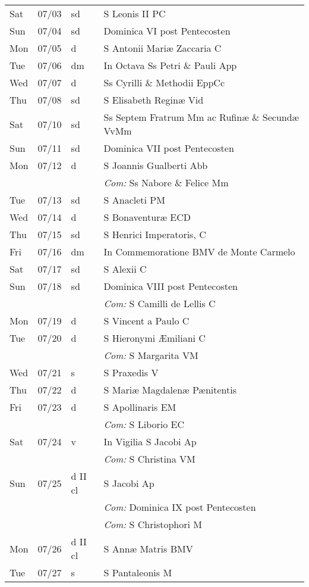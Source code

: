 \documentclass[10pt]{article}
\begin{document}
\begin{longtable}{ l l l l }
Sat & 07/03 & sd & S Leonis II PC\\
Sun & 07/04 & sd & Dominica VI post Pentecosten\\
Mon & 07/05 & d & S Antonii Mariæ Zaccaria C\\
Tue & 07/06 & dm & In Octava Ss Petri \& Pauli App\\
Wed & 07/07 & d & Ss Cyrilli \& Methodii EppCc\\
Thu & 07/08 & sd & S Elisabeth Reginæ Vid\\
Sat & 07/10 & sd & Ss Septem Fratrum Mm ac Rufinæ \& Secundæ VvMm\\
Sun & 07/11 & sd & Dominica VII post Pentecosten\\
Mon & 07/12 & d & S Joannis Gualberti Abb\\
 & & & \textit{Com:} Ss Nabore \& Felice Mm\\
Tue & 07/13 & sd & S Anacleti PM\\
Wed & 07/14 & d & S Bonaventuræ ECD\\
Thu & 07/15 & sd & S Henrici Imperatoris, C\\
Fri & 07/16 & dm & In Commemoratione BMV de Monte Carmelo\\
Sat & 07/17 & sd & S Alexii C\\
Sun & 07/18 & sd & Dominica VIII post Pentecosten\\
 & & & \textit{Com:} S Camilli de Lellis C\\
Mon & 07/19 & d & S Vincent a Paulo C\\
Tue & 07/20 & d & S Hieronymi Æmiliani C\\
 & & & \textit{Com:} S Margarita VM\\
Wed & 07/21 & s & S Praxedis V\\
Thu & 07/22 & d & S Mariæ Magdalenæ Pænitentis\\
Fri & 07/23 & d & S Apollinaris EM\\
 & & & \textit{Com:} S Liborio EC\\
Sat & 07/24 & v & In Vigilia S Jacobi Ap\\
 & & & \textit{Com:} S Christina VM\\
Sun & 07/25 & d II cl & S Jacobi Ap\\
 & & & \textit{Com:} Dominica IX post Pentecosten\\
 & & & \textit{Com:} S Christophori M\\
Mon & 07/26 & d II cl & S Annæ Matris BMV\\
Tue & 07/27 & s & S Pantaleonis M\\

\end{longtable}
\end{document}
